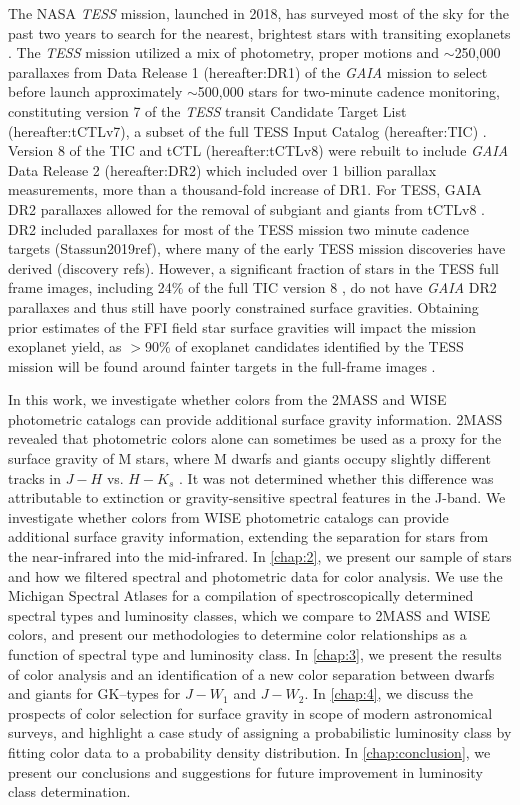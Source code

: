 The NASA \textit{TESS} mission, launched in 2018, has surveyed most of the sky for the past two years to search for the nearest, brightest stars with transiting exoplanets \citep{Ricker2015}. The \textit{TESS} mission utilized a mix of photometry, proper motions and $\sim$250,000 parallaxes from Data Release 1 (hereafter:DR1) of the \textit{GAIA} mission to select before launch approximately $\sim$500,000 stars for two-minute cadence monitoring, constituting version 7 of the \textit{TESS} transit Candidate Target List (hereafter:tCTLv7), a subset of the full TESS Input Catalog (hereafter:TIC) \citep{Staussun2018REF}. Version 8 of the TIC and tCTL (hereafter:tCTLv8) were rebuilt to include \textit{GAIA} Data Release 2 (hereafter:DR2) which included over 1 billion parallax measurements, more than a thousand-fold increase of DR1. For TESS, GAIA DR2 parallaxes allowed for the removal of subgiant and giants from tCTLv8 \citep{Stassun2019}. DR2 included parallaxes for most of the TESS mission two minute cadence targets (Stassun2019ref), where many of the early TESS mission discoveries have derived (discovery refs). However, a significant fraction of stars in the TESS full frame images, including 24\% of the full TIC version 8 \citep{Stassun2019}, do not have \textit{GAIA} DR2 parallaxes and thus still have poorly constrained surface gravities. Obtaining prior estimates of the FFI field star surface gravities will impact the mission exoplanet yield, as $>$90\% of exoplanet candidates identified by the TESS mission will be found around fainter targets in the full-frame images \citep{Barclay2018}.

In this work, we investigate whether colors from the 2MASS and WISE photometric catalogs can provide additional surface gravity information. 2MASS revealed that photometric colors alone can sometimes be used as a proxy for the surface gravity of M stars, where M dwarfs and giants occupy slightly different tracks in $J-H$ vs. $H-K_s$ \citep{Ciardi2011,Plavchan2008,Plavchan2006,Skrutskie2006}. It was not determined whether this difference was attributable to extinction or gravity-sensitive spectral features in the J-band. We investigate whether colors from WISE photometric catalogs can provide additional surface gravity information, extending the separation for stars from the near-infrared into the mid-infrared. In \autoref{chap:2}, we present our sample of stars and how we filtered spectral and photometric data for color analysis. We use the Michigan Spectral Atlases for a compilation of spectroscopically determined spectral types and luminosity classes, which we compare to 2MASS and WISE colors, and present our methodologies to determine color relationships as a function of spectral type and luminosity class.  In \autoref{chap:3}, we present the results of color analysis and an identification of a new color separation between dwarfs and giants for GK--types for $J-W_{1}$ and  $J-W_{2}$. In \autoref{chap:4}, we discuss the prospects of color selection for surface gravity in scope of modern astronomical surveys, and highlight a case study of assigning a probabilistic luminosity class by fitting color data to a probability density distribution. In \autoref{chap:conclusion}, we present our conclusions and suggestions for future improvement in luminosity class determination.




